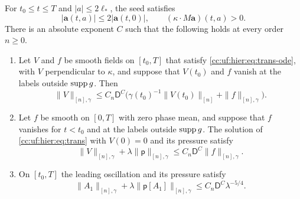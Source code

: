 \begin{lemma}\label{cc:uf:tower:lem:inverse}
For $t_0\le t\le T$ and $|a|\le2\ell_*$, the seed satisfies
\begin{equation}\label{cc:uf:tower:eq:near-origin}
 |\mathbf a(t,a)|\le2|\mathbf a(t,0)|,\qquad
 (\kappa\cdot M\mathbf a)(t,a)>0 .
\end{equation}
There is an absolute exponent $C$ such that the following holds at every
order $n\ge0$.
\begin{enumerate}[label=(\roman*),leftmargin=*]
\item Let $V$ and $f$ be smooth fields on $[t_0,T]$ that satisfy
\eqref{cc:uf:hier:eq:trans-ode}, with $V$ perpendicular to $\kappa$, and
suppose that $V(t_0)$ and $f$ vanish at the labels outside $\operatorname{supp} g$.
Then
\begin{equation}\label{cc:uf:tower:eq:seed-norm}
 \|V\|_{[n],\gamma}\le C_n\mathsf D^C
 \bigl(\gamma(t_0)^{-1}\|V(t_0)\|_{[n]}+\|f\|_{[n],\gamma}\bigr).
\end{equation}
\item Let $f$ be smooth on $[0,T]$ with zero phase mean, and suppose
that $f$ vanishes for $t<t_0$ and at the labels outside $\operatorname{supp} g$.
The solution of \eqref{cc:uf:hier:eq:trans} with $V(0)=0$ and its
pressure satisfy
\begin{equation}\label{cc:uf:hier:eq:trans-bound}
 \|V\|_{[n],\gamma}+\lambda\|\mathsf p\|_{[n],\gamma}
 \le C_n\mathsf D^C\|f\|_{[n],\gamma}.
\end{equation}
\item On $[t_0,T]$ the leading oscillation and its pressure satisfy
\begin{equation}\label{cc:uf:hier:eq:size}
 \|A_1\|_{[n],\gamma}+\lambda\|\mathsf p[A_1]\|_{[n],\gamma}
 \le C_n\mathsf D^C\lambda^{-5/4}.
\end{equation}
\end{enumerate}
\end{lemma}
